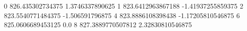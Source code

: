 0 826.435302734375 1.3746337890625
1 823.6412963867188 -1.41937255859375
2 823.5540771484375 -1.506591796875
4 823.8886108398438 -1.17205810546875
6 825.0606689453125 0.0
8 827.3889770507812 2.32830810546875

